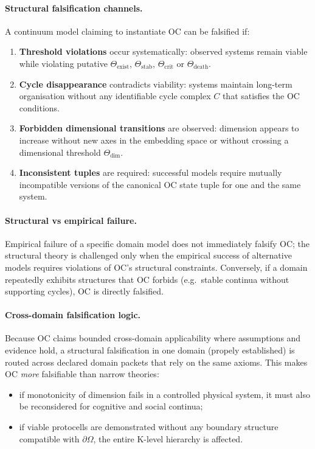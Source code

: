 \paragraph{Structural falsification channels.}
A continuum model claiming to instantiate OC can be falsified if:
\begin{enumerate}
  \item \textbf{Threshold violations} occur systematically:
        observed systems remain viable while violating putative
        \(\Theta_{\mathrm{exist}}\), \(\Theta_{\mathrm{stab}}\),
        \(\Theta_{\mathrm{crit}}\) or \(\Theta_{\mathrm{death}}\).
  \item \textbf{Cycle disappearance} contradicts viability:
        systems maintain long-term organisation without any identifiable
        cycle complex \(C\) that satisfies the OC conditions.
  \item \textbf{Forbidden dimensional transitions} are observed:
        dimension appears to increase without new axes in the embedding
        space or without crossing a dimensional threshold
        \(\Theta_{\mathrm{dim}}\).
  \item \textbf{Inconsistent tuples} are required:
        successful models require mutually incompatible versions of the
        canonical OC state tuple for one and the same system.
\end{enumerate}

\paragraph{Structural vs empirical failure.}
Empirical failure of a specific domain model does not immediately falsify OC;
the structural theory is challenged only when the empirical success of
alternative models requires violations of OC’s structural constraints.
Conversely, if a domain repeatedly exhibits structures that OC forbids
(e.g.\ stable continua without supporting cycles), OC is directly falsified.

\paragraph{Cross-domain falsification logic.}
Because OC claims bounded cross-domain applicability where assumptions and evidence hold, a structural falsification in one domain
(propely established) is routed across declared domain packets that rely on the same
axioms.  This makes OC \emph{more} falsifiable than narrow theories:
\begin{itemize}
  \item if monotonicity of dimension fails in a controlled physical system,
        it must also be reconsidered for cognitive and social continua;
  \item if viable protocells are demonstrated without any boundary structure
        compatible with \(\partial\Omega\), the entire K-level hierarchy is
        affected.
\end{itemize}

